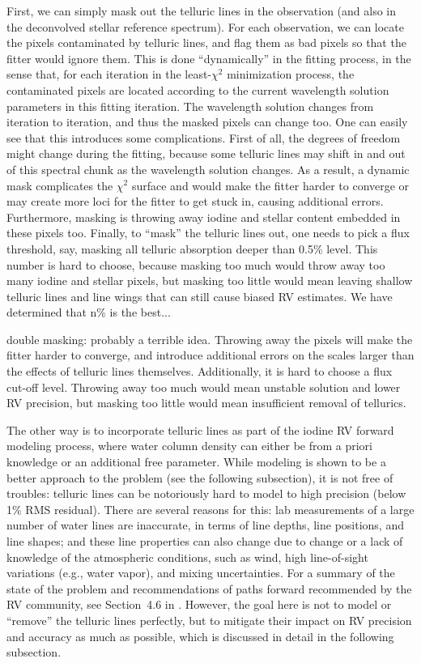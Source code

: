 First, we can simply mask out the telluric lines in the observation
(and also in the deconvolved stellar reference spectrum). For each
observation, we can locate the pixels contaminated by telluric lines,
and flag them as bad pixels so that the fitter would ignore them. This
is done ``dynamically'' in the fitting process, in the sense that, for
each iteration in the least-$\chi^2$ minimization process, the
contaminated pixels are located according to the current wavelength
solution parameters in this fitting iteration. The wavelength solution
changes from iteration to iteration, and thus the masked pixels can
change too. One can easily see that this introduces some
complications. First of all, the degrees of freedom might change
during the fitting, because some telluric lines may shift in and out
of this spectral chunk as the wavelength solution changes. As a result, a
dynamic mask complicates the $\chi^2$ surface and would make the
fitter harder to converge or may create more loci for the fitter to
get stuck in, causing additional errors. Furthermore, masking is throwing
away iodine and stellar content embedded in these pixels too. Finally, to
``mask'' the telluric lines out, one needs to pick a flux threshold,
say, masking all telluric absorption deeper than 0.5\% level. This
number is hard to choose, because masking too much would throw away
too many iodine and stellar pixels, but masking too little would mean
leaving shallow telluric lines and line wings that can still cause
biased RV estimates. We have determined that n\% is the best...

double masking: probably a terrible idea. Throwing away the
pixels will make the fitter harder to converge, and introduce
additional errors on the scales larger than the effects of telluric
lines themselves. Additionally, it is hard to choose a flux cut-off
level. Throwing away too much would mean unstable solution and lower
RV precision, but masking too little would mean insufficient removal
of tellurics.

The other way is to incorporate telluric lines as part of the iodine
RV forward modeling process, where water column density can either be
from a priori knowledge or an additional free parameter. While
modeling is shown to be a better approach to the problem (see the
following subsection), it is not free of troubles: telluric lines can
be notoriously hard to model to high precision (below 1\% RMS
residual). There are several reasons for this: lab measurements of a
large number of water lines are inaccurate, in terms of line depths,
line positions, and line shapes; and these line properties can also
change due to change or a lack of knowledge of the atmospheric
conditions, such as wind, high line-of-sight variations (e.g., water
vapor), and mixing uncertainties. For a summary of the state of the
problem and recommendations of paths forward recommended by the RV
community, see Section~4.6 in \cite{eprv2015}. However, the goal here
is not to model or ``remove'' the telluric lines perfectly, but to
mitigate their impact on RV precision and accuracy as much as
possible, which is discussed in detail in the following subsection.

